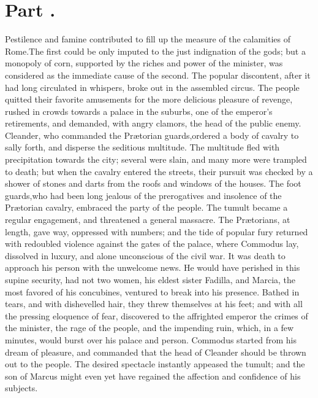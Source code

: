 \section{Part \thesection.}
\thispagestyle{simple}

Pestilence and famine contributed to fill up the measure of the
calamities of Rome.\footnotemark[25] The first could be only imputed to the
just indignation of the gods; but a monopoly of corn, supported
by the riches and power of the minister, was considered as the
immediate cause of the second. The popular discontent, after it
had long circulated in whispers, broke out in the assembled
circus. The people quitted their favorite amusements for the more
delicious pleasure of revenge, rushed in crowds towards a palace
in the suburbs, one of the emperor’s retirements, and demanded,
with angry clamors, the head of the public enemy. Cleander, who
commanded the Prætorian guards,\footnotemark[26] ordered a body of cavalry to
sally forth, and disperse the seditious multitude. The multitude
fled with precipitation towards the city; several were slain, and
many more were trampled to death; but when the cavalry entered
the streets, their pursuit was checked by a shower of stones and
darts from the roofs and windows of the houses. The foot guards,\footnotemark[27]
who had been long jealous of the prerogatives and insolence of
the Prætorian cavalry, embraced the party of the people. The
tumult became a regular engagement, and threatened a general
massacre. The Prætorians, at length, gave way, oppressed with
numbers; and the tide of popular fury returned with redoubled
violence against the gates of the palace, where Commodus lay,
dissolved in luxury, and alone unconscious of the civil war. It
was death to approach his person with the unwelcome news. He
would have perished in this supine security, had not two women,
his eldest sister Fadilla, and Marcia, the most favored of his
concubines, ventured to break into his presence. Bathed in tears,
and with dishevelled hair, they threw themselves at his feet; and
with all the pressing eloquence of fear, discovered to the
affrighted emperor the crimes of the minister, the rage of the
people, and the impending ruin, which, in a few minutes, would
burst over his palace and person. Commodus started from his dream
of pleasure, and commanded that the head of Cleander should be
thrown out to the people. The desired spectacle instantly
appeased the tumult; and the son of Marcus might even yet have
regained the affection and confidence of his subjects.\footnotemark[28]

